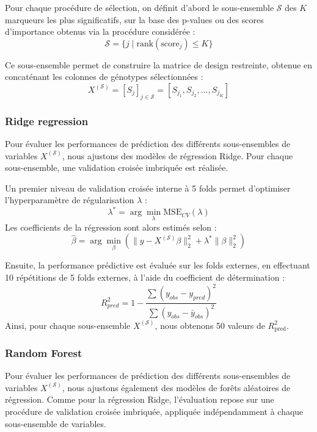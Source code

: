 \documentclass[
  11pt,
  letterpaper,
  DIV=11,
  numbers=noendperiod]{scrartcl}
\begin{document}
Pour chaque procédure de sélection, on définit d'abord le sous-ensemble
\(\mathcal{S}\) des \(K\) marqueurs les plus significatifs, sur la base
des p-values ou des scores d'importance obtenus via la procédure
considérée :
\[\mathcal{S} = \{ j \mid \text{rank}(\text{score}_{j}) \le K \}\]

Ce sous-ensemble permet de construire la matrice de design restreinte,
obtenue en concaténant les colonnes de génotypes sélectionnées :
\[X^{(\mathcal{S})} = \left[ S_j \right]_{j \in \mathcal{S}} = [ S_{j_1}, S_{j_2}, \dots, S_{j_K} ]\]

\hypertarget{ridge-regression}{%
\subsubsection{Ridge regression}\label{ridge-regression}}

Pour évaluer les performances de prédiction des différents
sous-ensembles de variables \(X^{(\mathcal{S})}\), nous ajustons des
modèles de régression Ridge. Pour chaque sous-ensemble, une validation
croisée imbriquée est réalisée.

Un premier niveau de validation croisée interne à 5 folds permet
d'optimiser l'hyperparamètre de régularisation \(\lambda\) :
\[\lambda^* = \arg \min_{\lambda} \text{MSE}_{CV}(\lambda)\] Les
coefficients de la régression sont alors estimés selon :
\[\hat{\beta} = \arg \min_{\beta} \left( \| y - X^{(\mathcal{S})}\beta \|^2_2 + \lambda^* \| \beta \|^2_2 \right)\]

Ensuite, la performance prédictive est évaluée sur les folds externes,
en effectuant 10 répétitions de 5 folds externes, à l'aide du
coefficient de détermination :
\[R^2_{pred} = 1 - \frac{\sum (y_{obs} - y_{pred})^2}{\sum (y_{obs} - \bar{y}_{obs})^2}\]
Ainsi, pour chaque sous-ensemble \(X^{(\mathcal{S})}\), nous obtenons 50
valeurs de \(R^2_{\text{pred}}\).

\hypertarget{random-forest}{%
\subsubsection{Random Forest}\label{random-forest}}

Pour évaluer les performances de prédiction des différents
sous-ensembles de variables \(X^{(\mathcal{S})}\), nous ajustons
également des modèles de forêts aléatoires de régression. Comme pour la
régression Ridge, l'évaluation repose sur une procédure de validation
croisée imbriquée, appliquée indépendamment à chaque sous-ensemble de
variables.
\end{document}
